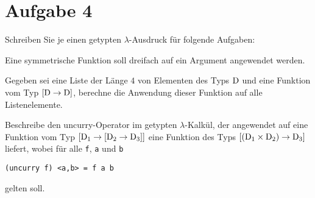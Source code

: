 \documentclass[ngerman,a4paper]{report}
\begin{document}
\section*{Aufgabe 4}
Schreiben Sie je einen getypten $\lambda$-Ausdruck für folgende Aufgaben:
\begin{compactenum}
\item Eine symmetrische Funktion soll dreifach auf ein Argument angewendet werden.\\
\item Gegeben sei eine Liste der Länge $4$ von Elementen des Typs $\text{\lstinline!D!}$ und eine Funktion vom Typ $[\text{\lstinline!D!} \rightarrow \text{\lstinline!D!}]$, berechne die Anwendung dieser Funktion auf alle Listenelemente.
\item Beschreibe den uncurry-Operator im getypten $\lambda$-Kalkül, der angewendet auf eine Funktion vom Typ $[\text{\lstinline!D!}_1 \rightarrow [\text{\lstinline!D!}_2 \rightarrow \text{\lstinline!D!}_3]]$ eine Funktion des Typs $[(\text{\lstinline!D!}_1 \times \text{\lstinline!D!}_2) \rightarrow \text{\lstinline!D!}_3]$ liefert, wobei für alle \lstinline!f!, \lstinline!a! und \lstinline!b!
\begin{lstlisting}
(uncurry f) <a,b> = f a b
\end{lstlisting}
gelten soll.
\end{compactenum}
\end{document}
